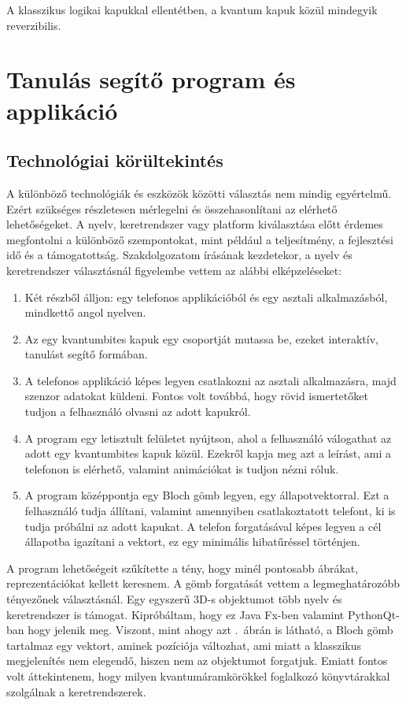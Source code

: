 \documentclass[
]{thesis-ekf}
\theoremstyle{definition}
\theoremstyle{remark}
\begin{document}
A klasszikus logikai kapukkal ellentétben, a kvantum kapuk közül mindegyik reverzibilis.

\chapter{Tanulás segítő program és applikáció}
\section{Technológiai körültekintés}
A különböző technológiák és eszközök közötti választás nem mindig egyértelmű. Ezért szükséges részletesen mérlegelni és összehasonlítani az elérhető lehetőségeket. A nyelv, keretrendszer vagy platform kiválasztása előtt érdemes megfontolni a különböző szempontokat, mint például a teljesítmény, a fejlesztési idő és a támogatottság. Szakdolgozatom írásának kezdetekor, a nyelv és keretrendszer választásnál figyelembe vettem az alábbi elképzeléseket:
\begin{enumerate}
	\item Két részből álljon: egy telefonos applikációból és egy asztali alkalmazásból, mindkettő angol nyelven.
	\item Az egy kvantumbites kapuk egy csoportját mutassa be, ezeket interaktív, tanulást segítő formában.
	\item A telefonos applikáció képes legyen csatlakozni az asztali alkalmazásra, majd szenzor adatokat küldeni. Fontos volt továbbá, hogy rövid ismertetőket tudjon a felhasználó olvasni az adott kapukról.
	\item A program egy letisztult felületet nyújtson, ahol a felhasználó válogathat az adott egy kvantumbites kapuk közül. Ezekről kapja meg azt a leírást, ami a telefonon is elérhető, valamint animációkat is tudjon nézni róluk.
	\item A program középpontja egy Bloch gömb legyen, egy állapotvektorral. Ezt a felhasználó tudja állítani, valamint amennyiben csatlakoztatott telefont, ki is tudja próbálni az adott kapukat. A telefon forgatásával képes legyen a cél állapotba igazítani a vektort, ez egy minimális hibatűréssel történjen.
\end{enumerate}

A program lehetőségeit szűkítette a tény, hogy minél pontosabb ábrákat, reprezentációkat kellett keresnem. A gömb forgatását vettem a legmeghatározóbb tényezőnek választásnál. Egy egyszerű 3D-s objektumot több nyelv és keretrendszer is támogat. Kipróbáltam, hogy ez Java Fx-ben valamint  PythonQt-ban hogy jelenik meg. Viszont, mint ahogy azt \az{\ref{fig:bitqubit}}.~ábrán is látható, a Bloch gömb tartalmaz egy vektort, aminek pozíciója változhat, ami miatt a klasszikus megjelenítés nem elegendő, hiszen nem az objektumot forgatjuk. Emiatt fontos volt áttekintenem, hogy milyen kvantumáramkörökkel foglalkozó könyvtárakkal szolgálnak a keretrendszerek.
\end{document}

